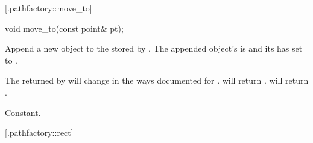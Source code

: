  [\iotwod.pathfactory::move_to] {}

%
%
\begin{itemdecl}
void move_to(const point& pt);
\end{itemdecl}
\begin{itemdescr}
	\pnum
	\effects
	Append a new  object to the  stored by 
	. The appended object's  is 
	 and its  has 
	 set to .
	
	\pnum
	\postconditions
	The  returned by  will change 
	in the ways documented for .
	 will return . 
	 will return .
	
	\pnum
	\complexity
	Constant.
\end{itemdescr}

 [\iotwod.pathfactory::rect] {}

